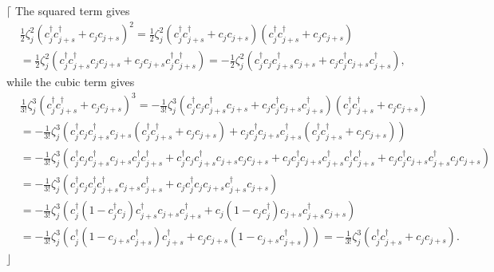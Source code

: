 \documentclass[aps, preprint]{revtex4}
\begin{document}
$\lceil $ The squared term gives
\begin{align} & \frac{1}{2} \zeta _{j}^{2} \left (c_{j}^{ \dag } c_{j +s}^{ \dag } +c_{j} c_{j +s}\right )^{2} =\frac{1}{2} \zeta _{j}^{2} \left (c_{j}^{ \dag } c_{j +s}^{ \dag } +c_{j} c_{j +s}\right ) \left (c_{j}^{ \dag } c_{j +s}^{ \dag } +c_{j} c_{j +s}\right ) \\
 &  =\frac{1}{2} \zeta _{j}^{2} \left (c_{j}^{ \dag } c_{j +s}^{ \dag } c_{j} c_{j +s} +c_{j} c_{j +s} c_{j}^{ \dag } c_{j +s}^{ \dag }\right ) = -\frac{1}{2} \zeta _{j}^{2} \left (c_{j}^{ \dag } c_{j} c_{j +s}^{ \dag } c_{j +s} +c_{j} c_{j}^{ \dag } c_{j +s} c_{j +s}^{ \dag }\right )\text{,}\end{align}while the cubic term gives
\begin{align} & \frac{1}{3 !} \zeta _{j}^{3} \left (c_{j}^{ \dag } c_{j +s}^{ \dag } +c_{j} c_{j +s}\right )^{3} = -\frac{1}{3 !} \zeta _{j}^{3} \left (c_{j}^{ \dag } c_{j} c_{j +s}^{ \dag } c_{j +s} +c_{j} c_{j}^{ \dag } c_{j +s} c_{j +s}^{ \dag }\right ) \left (c_{j}^{ \dag } c_{j +s}^{ \dag } +c_{j} c_{j +s}\right ) \\
 &  = -\frac{1}{3 !} \zeta _{j}^{3} \left (c_{j}^{ \dag } c_{j} c_{j +s}^{ \dag } c_{j +s} \left (c_{j}^{ \dag } c_{j +s}^{ \dag } +c_{j} c_{j +s}\right ) +c_{j} c_{j}^{ \dag } c_{j +s} c_{j +s}^{ \dag } \left (c_{j}^{ \dag } c_{j +s}^{ \dag } +c_{j} c_{j +s}\right )\right ) \\
 &  = -\frac{1}{3 !} \zeta _{j}^{3} \left (c_{j}^{ \dag } c_{j} c_{j +s}^{ \dag } c_{j +s} c_{j}^{ \dag } c_{j +s}^{ \dag } +c_{j}^{ \dag } c_{j} c_{j +s}^{ \dag } c_{j +s} c_{j} c_{j +s} +c_{j} c_{j}^{ \dag } c_{j +s} c_{j +s}^{ \dag } c_{j}^{ \dag } c_{j +s}^{ \dag } +c_{j} c_{j}^{ \dag } c_{j +s} c_{j +s}^{ \dag } c_{j} c_{j +s}\right ) \\
 &  = -\frac{1}{3 !} \zeta _{j}^{3} \left (c_{j}^{ \dag } c_{j} c_{j}^{ \dag } c_{j +s}^{ \dag } c_{j +s} c_{j +s}^{ \dag } +c_{j} c_{j}^{ \dag } c_{j} c_{j +s} c_{j +s}^{ \dag } c_{j +s}\right ) \\
 &  = -\frac{1}{3 !} \zeta _{j}^{3} \left (c_{j}^{ \dag } \left (1 -c_{j}^{ \dag } c_{j}\right ) c_{j +s}^{ \dag } c_{j +s} c_{j +s}^{ \dag } +c_{j} \left (1 -c_{j} c_{j}^{ \dag }\right ) c_{j +s} c_{j +s}^{ \dag } c_{j +s}\right ) \\
 &  = -\frac{1}{3 !} \zeta _{j}^{3} \left (c_{j}^{ \dag } \left (1 -c_{j +s} c_{j +s}^{ \dag }\right ) c_{j +s}^{ \dag } +c_{j} c_{j +s} \left (1 -c_{j +s} c_{j +s}^{ \dag }\right )\right ) = -\frac{1}{3 !} \zeta _{j}^{3} \left (c_{j}^{ \dag } c_{j +s}^{ \dag } +c_{j} c_{j +s}\right )\text{.}\end{align}$\rfloor $ 
\end{document}
